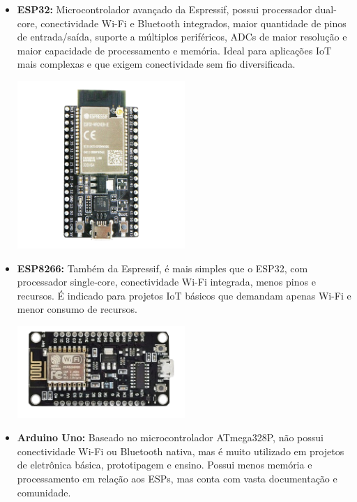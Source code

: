 \documentclass[a4paper]{article}
\begin{document}
    \begin{answer}
        \begin{itemize}
            \item \textbf{ESP32:} Microcontrolador avançado da Espressif, possui processador dual-core, conectividade Wi-Fi e Bluetooth integrados, maior quantidade de pinos de entrada/saída, suporte a múltiplos periféricos, ADCs de maior resolução e maior capacidade de processamento e memória. Ideal para aplicações IoT mais complexas e que exigem conectividade sem fio diversificada.
                \begin{center}
                    \includegraphics[width=0.5\textwidth]{images/esp32.png}
                \end{center}
            \item \textbf{ESP8266:} Também da Espressif, é mais simples que o ESP32, com processador single-core, conectividade Wi-Fi integrada, menos pinos e recursos. É indicado para projetos IoT básicos que demandam apenas Wi-Fi e menor consumo de recursos.
                \begin{center}
                    \includegraphics[width=0.5\textwidth]{images/esp8266.png}
                \end{center}
            \item \textbf{Arduino Uno:} Baseado no microcontrolador ATmega328P, não possui conectividade Wi-Fi ou Bluetooth nativa, mas é muito utilizado em projetos de eletrônica básica, prototipagem e ensino. Possui menos memória e processamento em relação aos ESPs, mas conta com vasta documentação e comunidade.

\end{itemize}
\end{answer}
\end{document}
